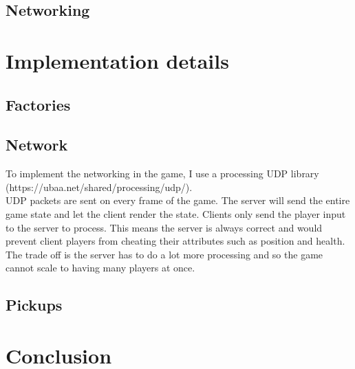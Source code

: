 \documentclass{article}
\newcommand{\n}[0]{\\[\baselineskip]}
\begin{document}
\subsection{Networking}

\section{Implementation details}


\subsection{Factories}

\subsection{Network}
To implement the networking in the game, I use a processing UDP library (https://ubaa.net/shared/processing/udp/).
\n
UDP packets are sent on every frame of the game. The server will send the entire game state and let the client render the state. Clients only send the player input to the server to process. This means the server is always correct and would prevent client players from cheating their attributes such as position and health. The trade off is the server has to do a lot more processing and so the game cannot scale to having many players at once.


\subsection{Pickups}

\section{Conclusion}


\printbibliography
\end{document}
